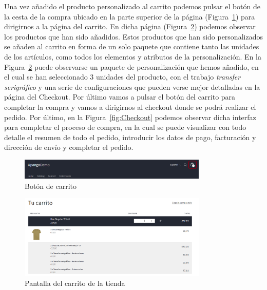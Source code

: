 \documentclass[12pt]{article}
\begin{document}
Una vez añadido el producto personalizado al carrito podemos pulsar el botón de la cesta de la compra ubicado en la parte superior de la página (Figura~\ref{fig:BotonCarrito}) para dirigirnos a la página del carrito.
En dicha página (Figura~\ref{fig:Carrito}) podemos observar los productos que han sido añadidos. Estos productos que han sido personalizados se añaden al carrito en forma de un solo paquete que contiene
tanto las unidades de los artículos, como todos los elementos y atributos de la personalización.
En la Figura~\ref{fig:Carrito} puede observarse un paquete de personalización que hemos añadido, en el cual se han seleccionado 3 unidades del producto, con el trabajo \textit{transfer serigráfico} y una serie de configuraciones 
que pueden verse mejor detalladas en la página del Checkout. Por último vamos a pulsar el botón del carrito para completar la compra y vamos a dirigirnos al checkout donde se podrá realizar el pedido.
Por último, en la Figura~\ref{fig:Checkout} podemos observar dicha interfaz para completar el proceso de compra, en la cual se puede visualizar con todo detalle el resumen de todo el pedido, introducir los datos de pago, facturación y dirección de envío
y completar el pedido.


\begin{figure}[ht]
    \centering
    \includegraphics[width=0.8\textwidth]{imagenes/ManualUsuario/BotonCarrito.png}
    \caption{\label{fig:BotonCarrito}Botón de carrito}
    \vspace{\fill}
\end{figure}

\begin{figure}[ht]
    \centering
    \includegraphics[width=0.8\textwidth]{imagenes/ManualUsuario/PantallaCarrito.png}
    \caption{\label{fig:Carrito}Pantalla del carrito de la tienda}
    \vspace{\fill}
\end{figure}
\end{document}
